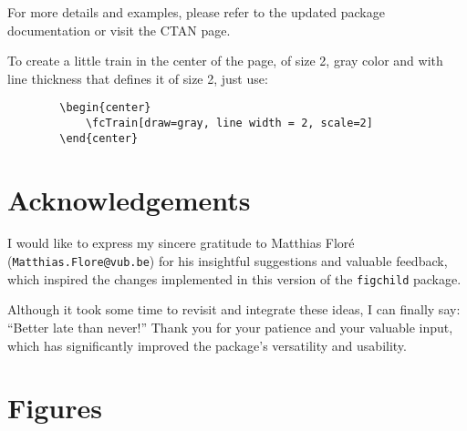 \documentclass[x11names]{article}
\begin{document}
	\noindent
	For more details and examples, please refer to the updated package documentation or visit the CTAN page.
	
    To create a little train in the center of the page, of size 2, gray color and with line thickness that defines it of size 2, just use:
	
	\begin{verbatim}
		\begin{center}
			\fcTrain[draw=gray, line width = 2, scale=2]
		\end{center}
	\end{verbatim}
	
	\begin{center}
		\fcTrain[draw=gray, line width = 2, scale=2]
	\end{center}
	
	\section*{Acknowledgements}
	
	I would like to express my sincere gratitude to Matthias Floré (\texttt{Matthias.Flore@vub.be}) for his insightful suggestions and valuable feedback, which inspired the changes implemented in this version of the \texttt{figchild} package.
	
	Although it took some time to revisit and integrate these ideas, I can finally say: “Better late than never!” Thank you for your patience and your valuable input, which has significantly improved the package’s versatility and usability.
	
	

	
	
	
	\section{Figures}
	
\end{document}
